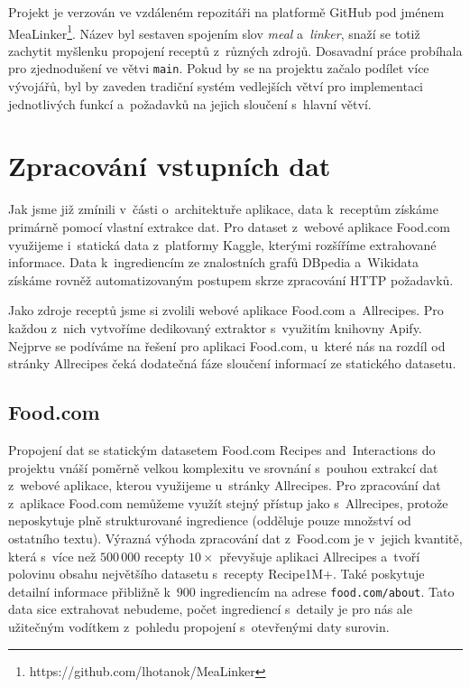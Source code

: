 Projekt je verzován ve vzdáleném repozitáři na platformě GitHub pod jménem MeaLinker\footnote{https://github.com/lhotanok/MeaLinker}. Název byl sestaven spojením slov \emph{meal} a~\emph{linker}, snaží se totiž zachytit myšlenku propojení receptů z~různých zdrojů. Dosavadní práce probíhala pro zjednodušení ve větvi \texttt{main}. Pokud by se na projektu začalo podílet více vývojářů, byl by zaveden tradiční systém vedlejších větví pro implementaci jednotlivých funkcí a~požadavků na jejich sloučení s~hlavní větví.

\section{Zpracování vstupních dat}

Jak jsme již zmínili v~části o~architektuře aplikace, data k~receptům získáme primárně pomocí vlastní extrakce dat. Pro dataset z~webové aplikace Food.com využijeme i~statická data z~platformy Kaggle, kterými rozšíříme extrahované informace. Data k~ingrediencím ze znalostních grafů DBpedia a~Wikidata získáme rovněž automatizovaným postupem skrze zpracování HTTP požadavků.

Jako zdroje receptů jsme si zvolili webové aplikace Food.com a~Allrecipes. Pro každou z~nich vytvoříme dedikovaný extraktor s~využitím knihovny Apify. Nejprve se podíváme na řešení pro aplikaci Food.com, u~které nás na rozdíl od stránky Allrecipes čeká dodatečná fáze sloučení informací ze statického datasetu.

\subsection{Food.com}

Propojení dat se statickým datasetem Food.com Recipes and~Interactions do projektu vnáší poměrně velkou komplexitu ve srovnání s~pouhou extrakcí dat z~webové aplikace, kterou využijeme u~stránky Allrecipes. Pro zpracování dat z~aplikace Food.com nemůžeme využít stejný přístup jako s~Allrecipes, protože neposkytuje plně strukturované ingredience (odděluje pouze množství od ostatního textu). Výrazná výhoda zpracování dat z~Food.com je v~jejich kvantitě, která s~více než $500\,000$ recepty $10\times$ převyšuje aplikaci Allrecipes a~tvoří polovinu obsahu největšího datasetu s~recepty Recipe1M+. Také poskytuje detailní informace přibližně k~$900$ ingrediencím na adrese \texttt{food.com/about}. Tato data sice extrahovat nebudeme, počet ingrediencí s~detaily je pro nás ale užitečným vodítkem z~pohledu propojení s~otevřenými daty surovin.

